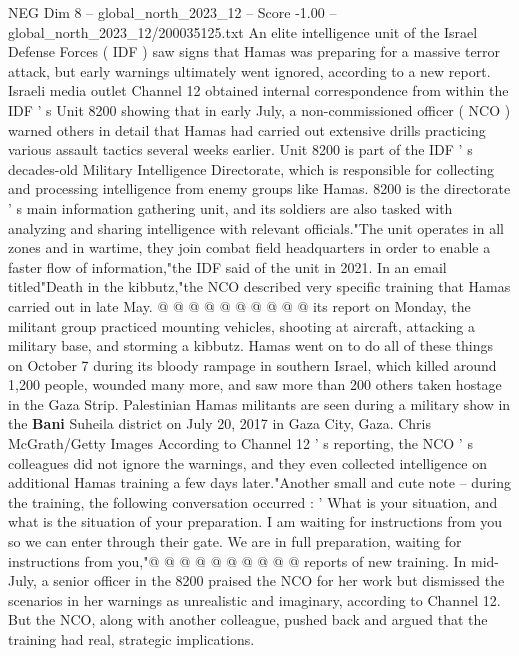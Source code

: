 \begin{textsample}{NEG Dim 8 – global\_north\_2023\_12 – Score -1.00 – global\_north\_2023\_12/200035125.txt}  \label{ex:f8_neg_345}
An elite intelligence unit of the Israel Defense Forces ( IDF ) saw signs that Hamas was preparing for a massive terror attack, but early warnings ultimately went ignored, according to a new report.
Israeli media outlet Channel 12 obtained internal correspondence from within the IDF ' s Unit 8200 showing that in early July, a non-commissioned officer ( NCO ) warned others in detail that Hamas had carried out extensive drills practicing various assault tactics several weeks earlier.
Unit 8200 is part of the IDF ' s decades-old Military Intelligence Directorate, which is responsible for collecting and processing intelligence from enemy groups like Hamas. 8200 is the directorate ' s main information gathering unit, and its soldiers are also tasked with analyzing and sharing intelligence with relevant officials."The unit operates in all zones and in wartime, they join combat field headquarters in order to enable a faster flow of information,"the IDF said of the unit in 2021.
In an email titled"Death in the kibbutz,"the NCO described very specific training that Hamas carried out in late May. @ @ @ @ @ @ @ @ @ @ its report on Monday, the militant group practiced mounting vehicles, shooting at aircraft, attacking a military base, and storming a kibbutz.
Hamas went on to do all of these things on October 7 during its bloody rampage in southern Israel, which killed around 1,200 people, wounded many more, and saw more than 200 others taken hostage in the Gaza Strip.
Palestinian Hamas militants are seen during a military show in the \textbf{Bani} Suheila district on July 20, 2017 in Gaza City, Gaza.
Chris McGrath/Getty Images According to Channel 12 ' s reporting, the NCO ' s colleagues did not ignore the warnings, and they even collected intelligence on additional Hamas training a few days later."Another small and cute note -- during the training, the following conversation occurred : ' What is your situation, and what is the situation of your preparation.
I am waiting for instructions from you so we can enter through their gate.
We are in full preparation, waiting for instructions from you,"@ @ @ @ @ @ @ @ @ @ reports of new training.
In mid-July, a senior officer in the 8200 praised the NCO for her work but dismissed the scenarios in her warnings as unrealistic and imaginary, according to Channel 12.
But the NCO, along with another colleague, pushed back and argued that the training had real, strategic implications.

\end{textsample}

